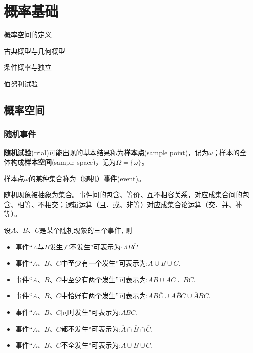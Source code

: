 \chapter{概率基础}\label{chap:probability_space}

\begin{introduction}[考试重点]
    \item 概率空间的定义
    \item 古典概型与几何概型
    \item 条件概率与独立
    \item 伯努利试验
\end{introduction}

\section{概率空间}

\subsection{随机事件}

\begin{definition}[样本空间]
    \textbf{随机试验}(trial)可能出现的\underline{基本}结果称为\textbf{样本点}(sample point)，记为$\omega$；样本的全体构成\textbf{样本空间}(sample space)，记为$\Omega=\{ \omega \}$。
\end{definition}

\begin{definition}[事件的古典定义]
    样本点$\omega$的某种集合称为（随机）\textbf{事件}(event)。
\end{definition}

随机现象被抽象为集合。事件间的包含、等价、互不相容关系，对应成集合间的包含、相等、不相交；逻辑运算（且、或、非等）对应成集合论运算（交、并、补等）。

\begin{example}
    设$A$、$B$、$C$是某个随机现象的三个事件, 则
    \begin{itemize}
        \item 事件“$A$与$B$发生,$C$不发生”可表示为:$AB\overline{C}$.
        \item 事件“$A$、$B$、$C$中至少有一个发生”可表示为:$A \cup B \cup C$.
        \item 事件“$A$、$B$、$C$中至少有两个发生”可表示为:$AB \cup AC \cup BC$.
        \item 事件“$A$、$B$、$C$中恰好有两个发生”可表示为:$AB\overline{C} \cup A\overline{B}C \cup \overline{A}BC$.
        \item 事件“$A$、$B$、$C$同时发生”可表示为:$ABC$.
        \item 事件“$A$、$B$、$C$都不发生”可表示为:$\overline{A} \cap \overline{B} \cap \overline{C}$.
        \item 事件“$A$、$B$、$C$不全发生”可表示为:$\overline{A} \cup \overline{B} \cup \overline{C}$.
    \end{itemize}
\end{example}

